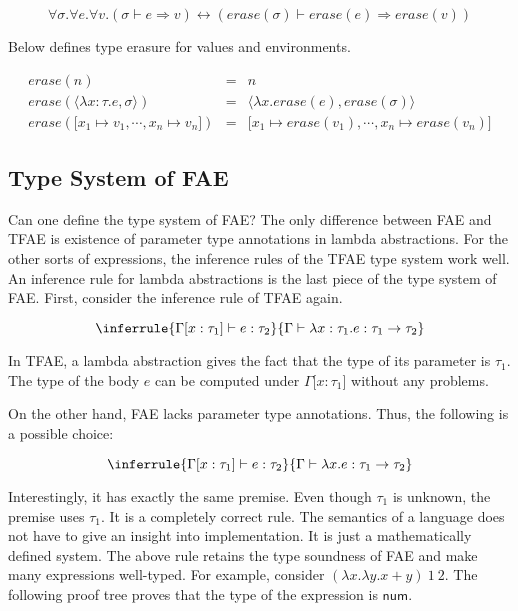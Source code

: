 \[
\forall\sigma.\forall e.\forall v.
(\sigma\vdash e\Rightarrow
v)\leftrightarrow(\mathit{erase}(\sigma)\vdash\mathit{erase}(e)\Rightarrow\mathit{erase}(v))
\]

Below defines type erasure for values and environments.

\[
\begin{array}{rcl}
\mathit{erase}(n) &=& n \\
\mathit{erase}(\langle\lambda x:\tau.e,\sigma\rangle) &=& \langle\lambda
x.\mathit{erase}(e),\mathit{erase}(\sigma)\rangle \\
\mathit{erase}(\lbrack x_1\mapsto v_1,\cdots,x_n\mapsto v_n\rbrack) &=&\lbrack
x_1\mapsto\mathit{erase}(v_1),\cdots,x_n\mapsto\mathit{erase}(v_n)\rbrack
\end{array}
\]


\subsection{Type System of FAE}

Can one define the type system of FAE? The only difference between FAE and TFAE
is existence of parameter type annotations in lambda abstractions. For the other
sorts of expressions, the inference rules of the TFAE type system work well.
An inference rule for lambda abstractions is the last piece of the type system
of FAE. First, consider the inference rule of TFAE again.

\[
\inferrule
{ \Gamma\lbrack x:\tau_1\rbrack\vdash e:\tau_2 }
{ \Gamma\vdash \lambda x:\tau_1.e:\tau_1\rightarrow\tau_2 }
\]

In TFAE, a lambda abstraction gives the fact that the type of its parameter is
$\tau_1$. The type of the body $e$ can be computed under $\Gamma\lbrack
x:\tau_1\rbrack$
without any problems.

On the other hand, FAE lacks parameter type annotations. Thus, the following is
a possible choice:

\[
\inferrule
{ \Gamma\lbrack x:\tau_1\rbrack\vdash e:\tau_2 }
{ \Gamma\vdash \lambda x.e:\tau_1\rightarrow\tau_2 }
\]

Interestingly, it has exactly the same premise. Even though $\tau_1$ is
unknown, the premise uses $\tau_1$. It is a completely correct rule. The
semantics of a language does not have to give an insight into implementation.
It is just a mathematically defined system. The above rule retains the type
soundness of FAE and make many expressions well-typed. For example, consider
$(\lambda x.\lambda y.x+y)\ 1\ 2$. The following proof tree proves that the
type of the expression is $\textsf{num}$.

